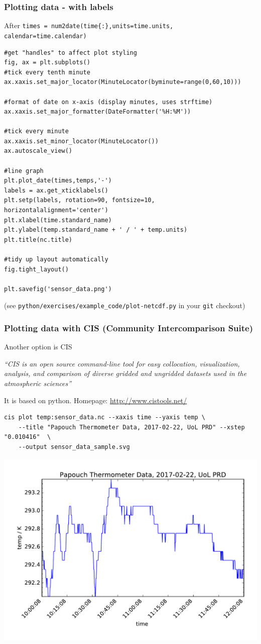 \documentclass[aspectratio=1610,9pt]{beamer} %
\begin{document}
\begin{frame}[fragile]
\frametitle{Plotting data - with labels}

After
\texttt{times = num2date(time\{:\},units=time.units, calendar=time.calendar)}

\begin{verbatim}
#get "handles" to affect plot styling
fig, ax = plt.subplots()
#tick every tenth minute
ax.xaxis.set_major_locator(MinuteLocator(byminute=range(0,60,10)))

#format of date on x-axis (display minutes, uses strftime)
ax.xaxis.set_major_formatter(DateFormatter('%H:%M'))

#tick every minute
ax.xaxis.set_minor_locator(MinuteLocator())
ax.autoscale_view()

#line graph
plt.plot_date(times,temps,'-')
labels = ax.get_xticklabels()
plt.setp(labels, rotation=90, fontsize=10, horizontalalignment='center')
plt.xlabel(time.standard_name)
plt.ylabel(temp.standard_name + ' / ' + temp.units)
plt.title(nc.title)

#tidy up layout automatically
fig.tight_layout()

plt.savefig('sensor_data.png')
\end{verbatim}

(see \texttt{python/exercises/example\_code/plot-netcdf.py} in your
\texttt{git} checkout)

\end{frame}
\begin{frame}[fragile]
\frametitle{Plotting data with CIS (Community Intercomparison
Suite)}

Another option is CIS

\emph{``CIS is an open source command-line tool for easy collocation,
visualization, analysis, and comparison of diverse gridded and ungridded
datasets used in the atmospheric sciences''}

It is based on python. Homepage:
\href{http://www.cistools.net/}{http://www.cistools.net/}

\begin{verbatim}
cis plot temp:sensor_data.nc --xaxis time --yaxis temp \ 
    --title "Papouch Thermometer Data, 2017-02-22, UoL PRD" --xstep "0.010416"  \ 
    --output sensor_data_sample.svg
\end{verbatim}
\end{frame}
\begin{frame}

\includegraphics[width=\textwidth]{sensor_data_sample}

\end{frame}
\end{document}
